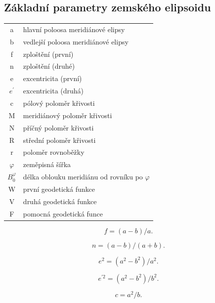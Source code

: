 \documentclass[11pt,a4paper]{article}
\begin{document}
\newpage
\begin{appendices}

\section{Základní parametry zemského elipsoidu} \label{appRefEll}

\begin{table}[ht!]
\begin{tabular}{c l}

a & hlavní poloosa meridiánové elipsy \\
b & vedlejší poloosa meridiánové elipsy\\
f & zploštění (první)\\
n & zploštění (druhé)\\
e & excentricita (první)\\
$e^{'}$ & excentricita (druhá)\\
c & pólový poloměr křivosti\\
M & meridiánový poloměr křivosti\\
N & příčný poloměr křivosti\\
R & střední poloměr křivosti\\
r & poloměr rovnoběžky\\
$\varphi$ & zeměpisná šířka\\
$B_{0}^{\varphi}$ & délka oblouku meridiánu od rovníku po $\varphi$ \\
W & první geodetická funkce\\
V & druhá geodetická funkce\\
F & pomocná geodetická funce\\      
\end{tabular}
\end{table}

\begin{equation}
f = (a-b)/a.
\end{equation}

\begin{equation}
n = (a-b)/(a+b).
\end{equation}

\begin{equation}
e^{2} = (a^{2}-b^{2})/a^{2}.
\end{equation}

\begin{equation}
e^{'2} = (a^{2}-b^{2})/b^{2}.
\end{equation}

\begin{equation}
c = a^{2}/b.
\end{equation}


\end{appendices}
\end{document}
